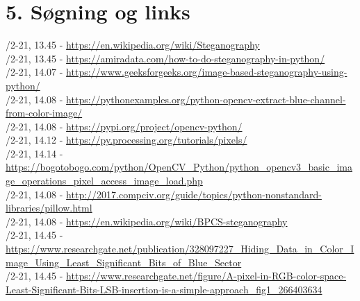 \documentclass[10pt]{report}
\begin{document}
\chapter*{5. Søgning og links}
\pagestyle{fancy}
/2-21, 13.45 - \href{https://en.wikipedia.org/wiki/Steganography}{https://en.wikipedia.org/wiki/Steganography}\\
/2-21, 13.45 - \href{https://amiradata.com/how-to-do-steganography-in-python/}{https://amiradata.com/how-to-do-steganography-in-python/}\\
/2-21, 14.07 - \href{https://www.geeksforgeeks.org/image-based-steganography-using-python/}{https://www.geeksforgeeks.org/image-based-steganography-using-python/}\\
/2-21, 14.08 - \href{https://pythonexamples.org/python-opencv-extract-blue-channel-from-color-image/}{https://pythonexamples.org/python-opencv-extract-blue-channel-from-color-image/}\\
/2-21, 14.08 - \href{https://pypi.org/project/opencv-python/}{https://pypi.org/project/opencv-python/}\\
/2-21, 14.12 - \href{https://py.processing.org/tutorials/pixels/}{https://py.processing.org/tutorials/pixels/}\\
/2-21, 14.14 - \href{https://bogotobogo.com/python/OpenCV_Python/python_opencv3_basic_image_operations_pixel_access_image_load.php}{https://bogotobogo.com/python/OpenCV\_Python/python\_opencv3\_basic\_image\_operations\_pixel\_\newline access\_image\_load.php}\\
/2-21, 14.08 - \href{http://2017.compciv.org/guide/topics/python-nonstandard-libraries/pillow.html}{http://2017.compciv.org/guide/topics/python-nonstandard-libraries/pillow.html}\\
/2-21, 14.08 - \href{https://en.wikipedia.org/wiki/BPCS-steganography}{https://en.wikipedia.org/wiki/BPCS-steganography}\\
/2-21, 14.45 - \href{https://www.researchgate.net/publication/328097227_Hiding_Data_in_Color_Image_Using_Least_Significant_Bits_of_Blue_Sector}{https://www.researchgate.net/publication/328097227\_Hiding\_Data\_in\_Color\_Image\_Using\_\newline Least\_Significant\_Bits\_of\_Blue\_Sector}\\
/2-21, 14.45 - \href{https://www.researchgate.net/figure/A-pixel-in-RGB-color-space-Least-Significant-Bits-LSB-insertion-is-a-simple-approach_fig1_266403634}{https://www.researchgate.net/figure/A-pixel-in-RGB-color-space-Least-Significant-Bits-LSB-insertion-is-a-simple-approach\_fig1\_266403634}\\
\end{document}
